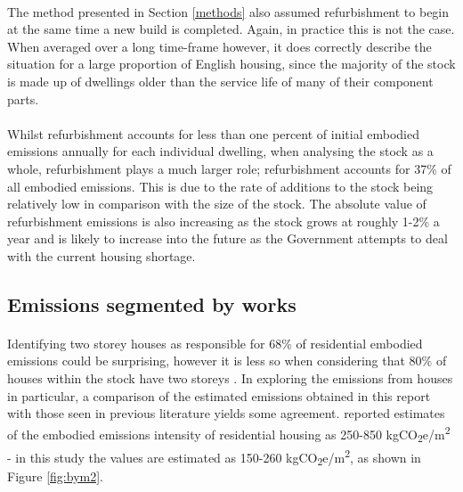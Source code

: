 \documentclass[12pt]{article}
\begin{document}
\paragraph{}
The method presented in Section \ref{methods} also assumed refurbishment to begin at the same time a new build is completed. Again, in practice this is not the case. When averaged over a long time-frame however, it does correctly describe the situation for a large proportion of English housing, since the majority of the stock is made up of dwellings older than the service life of many of their component parts.

\paragraph{}
Whilst refurbishment accounts for less than one percent of initial embodied emissions annually for each individual dwelling, when analysing the stock as a whole, refurbishment plays a much larger role; refurbishment accounts for 37\% of all embodied emissions. This is due to the rate of additions to the stock being relatively low in comparison with the size of the stock. The absolute value of refurbishment emissions is also increasing as the stock grows at roughly 1-2\% a year and is likely to increase into the future as the Government attempts to deal with the current housing shortage.

\subsection{Emissions segmented by works}

\paragraph{}
Identifying two storey houses as responsible for 68\% of residential embodied emissions could be surprising, however it is less so when considering that 80\% of houses within the stock have two storeys \citep{Department_for_Communities_and_Local_Government2010-op}. In exploring the emissions from houses in particular, a comparison of the estimated emissions obtained in this report with those seen in previous literature yields some agreement. \citet{Suzuki1995-ve} reported estimates of the embodied emissions intensity of residential housing as 250-850 kgCO\textsubscript{2}e/m\textsuperscript{2} - in this study the values are estimated as 150-260 kgCO\textsubscript{2}e/m\textsuperscript{2}, as shown in Figure \ref{fig:bym2}. 
\end{document}
